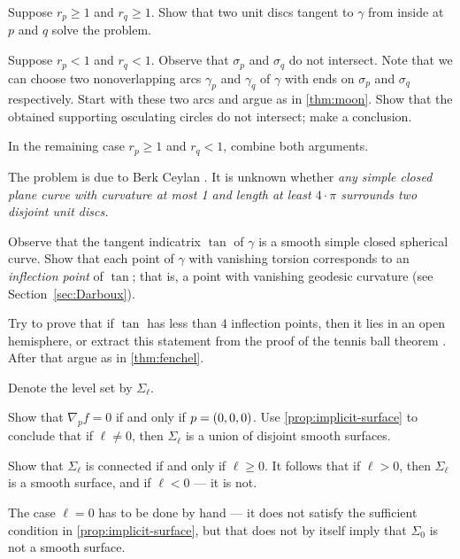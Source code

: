 Suppose $r_p\ge 1$ and $r_q\ge1$.
Show that two unit discs tangent to $\gamma$ from inside at $p$ and $q$ solve the problem.

Suppose $r_p<1$ and $r_q<1$.
Observe that $\sigma_p$ and $\sigma_q$ do not intersect.
Note that we can choose two nonoverlapping arcs $\gamma_p$ and $\gamma_q$ of $\gamma$ with ends on  $\sigma_p$ and $\sigma_q$ respectively.
Start with these two arcs and argue as in \ref{thm:moon}.
Show that the obtained supporting osculating circles do not intersect;
make a conclusion.

In the remaining case $r_p\ge 1$ and $r_q<1$, combine both arguments.

 The problem is due to Berk Ceylan \cite{ceylan}.
It is unknown whether \textit{any simple closed plane curve with curvature at most 1 and length at least $4\cdot\pi$ surrounds two disjoint unit discs.}

Observe that the tangent indicatrix $\tan$ of $\gamma$ is a smooth simple closed spherical curve.
Show that each point of $\gamma$ with vanishing torsion corresponds to an {}\emph{inflection point} of $\tan$;
that is, a point with vanishing geodesic curvature (see Section~\ref{sec:Darboux}).

Try to prove that if $\tan$ has less than $4$ inflection points, then it lies in an open hemisphere,
or extract this statement from the proof of the tennis ball theorem \cite[§ 20]{arnold1994}.
After that argue as in \ref{thm:fenchel}.



\setcounter{eqtn}{0}

Denote the level set by $\Sigma_\ell$.

Show that $\nabla_p f=0$ if and only if $p\z=(0,0,0)$.
Use \ref{prop:implicit-surface} to conclude that if $\ell\ne 0$, then $\Sigma_\ell$ is a union of disjoint smooth surfaces.

Show that $\Sigma_\ell$ is connected if and only if $\ell\ge 0$.
It follows that if $\ell>0$, then $\Sigma_\ell$ is a smooth surface, and if $\ell<0$ --- it is not.

The case $\ell=0$ has to be done by hand --- it does not satisfy the sufficient condition in \ref{prop:implicit-surface}, but that does not by itself imply that $\Sigma_0$ is not a smooth surface.

